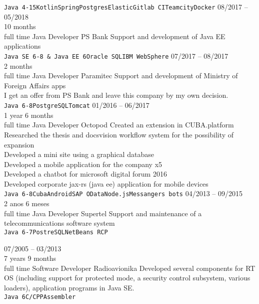 \begin{entrylist}
{    \texttt{Java 4-15}\slashsep\texttt{Kotlin}\slashsep\texttt{Spring}\slashsep\texttt{Postgres}\slashsep\texttt{Elastic}\slashsep\texttt{Gitlab CI}\slashsep\texttt{Teamcity}\slashsep\texttt{Docker}}
    \entry
    {08/2017 -- 05/2018\\\footnotesize{10 months\\full time}}
    {Java Developer}
    {PS Bank}
    {
        Support and development of Java EE applications \\
        \texttt{Java SE 6-8 \& Java EE 6}\slashsep\texttt{Oracle SQL}\slashsep\texttt{IBM WebSphere}}
    \entry
    {07/2017 -- 08/2017\\\footnotesize{2 months\\full time}}
    {Java Developer}
    {Paramitec}
    {
        Support and development of Ministry of Foreign Affairs apps \\
        I get an offer from PS Bank and leave this company by my own decision. \\
        \texttt{Java 6-8}\slashsep\texttt{PostgreSQL}\slashsep\texttt{Tomcat}}
    \entry
    {01/2016 -- 06/2017\\\footnotesize{1 year 6 months\\full time}}
    {Java Developer}
    {Octopod}
    {
        Created an extension in CUBA.platform \\
        Researched the thesis and docsvision workflow system for the possibility of expansion \\
        Developed a mini site using a graphical database \\
        Developed a mobile application for the company x5 \\
        Developed a chatbot for microsoft digital forum 2016 \\
        Developed corporate jax-rs (java ee) application for mobile devices\\
    \texttt{Java 6-8}\slashsep\texttt{Cuba}\slashsep\texttt{Android}\slashsep\texttt{SAP OData}\slashsep\texttt{Node.js}\slashsep\texttt{Messangers bots}}
    \entry
    {04/2013 -- 09/2015\\\footnotesize{2 anos 6 meses\\full time}}
    {Java Developer}
    {Supertel}
    {
        Support and maintenance of a telecommunications software system \\
        \texttt{Java 6-7}\slashsep\texttt{PostreSQL}\slashsep\texttt{NetBeans RCP}}

    \entry
    {07/2005 -- 03/2013\\\footnotesize{7 years 9 months\\full time}}
    {Software Developer}
    {Radioavionika}
    {
        Developed several components for RT OS (including support for protected mode, a security control subsystem, various loaders), application programs in Java SE. \\
    \texttt{Java 6}\slashsep\texttt{C/CPP}\slashsep\texttt{Assembler}}

\end{entrylist}

